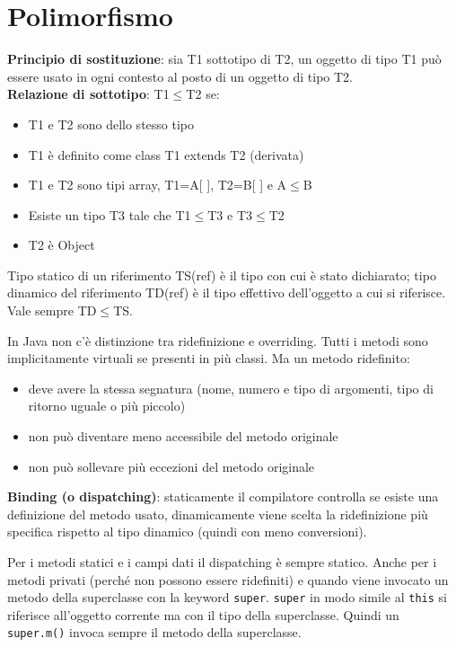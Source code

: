 \section{Polimorfismo} %

\textbf{Principio di sostituzione}: sia T1 sottotipo di T2, un oggetto di tipo T1 può essere usato in ogni contesto al posto di un oggetto di tipo T2. \\
\textbf{Relazione di sottotipo}: T1$\le$T2 se:
\begin{itemize}
\item T1 e T2 sono dello stesso tipo
\item T1 è definito come class T1 extends T2 (derivata)
\item T1 e T2 sono tipi array, T1=A[ ], T2=B[ ] e A$\le$B
\item Esiste un tipo T3 tale che T1$\le$T3 e T3$\le$T2
\item T2 è Object
\end{itemize}

Tipo statico di un riferimento TS(ref) è il tipo con cui è stato dichiarato; tipo dinamico del riferimento TD(ref) è il tipo effettivo dell'oggetto a cui si riferisce. Vale sempre TD$\le$TS.

In Java non c'è distinzione tra ridefinizione e overriding. Tutti i metodi sono implicitamente virtuali se presenti in più classi. Ma un metodo ridefinito:
\begin{itemize}
\item deve avere la stessa segnatura (nome, numero e tipo di argomenti, tipo di ritorno uguale o più piccolo)
\item non può diventare meno accessibile del metodo originale
\item non può sollevare più eccezioni del metodo originale
\end{itemize}
\textbf{Binding (o dispatching)}: staticamente il compilatore controlla se esiste una definizione del metodo usato, dinamicamente viene scelta la ridefinizione più specifica rispetto al tipo dinamico (quindi con meno conversioni).

Per i metodi statici e i campi dati il dispatching è sempre statico. Anche per i metodi privati (perché non possono essere ridefiniti) e quando viene invocato un metodo della superclasse con la keyword \texttt{super}. \texttt{super} in modo simile al \texttt{this} si riferisce all'oggetto corrente ma con il tipo della superclasse. Quindi un \texttt{super.m()} invoca sempre il metodo della superclasse.

